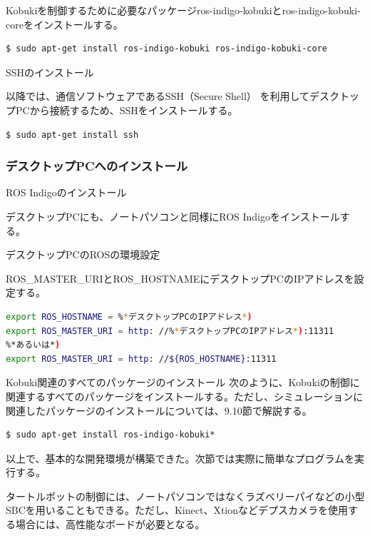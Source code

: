 \begin{itemize}
Kobukiを制御するために必要なパッケージros-indigo-kobukiとros-indigo-kobuki-coreをインストールする。

\begin{lstlisting}[language=ROS]
$ sudo apt-get install ros-indigo-kobuki ros-indigo-kobuki-core
\end{lstlisting}

\circled{\thenum} SSHのインストール

以降では、通信ソフトウェアであるSSH（Secure Shell）  を利用してデスクトップPCから接続するため、SSHをインストールする。

\begin{lstlisting}[language=ROS]
$ sudo apt-get install ssh
\end{lstlisting}


\subsubsection{デスクトップPCへのインストール}

\setcounter{num}{0}

\circled{\thenum} ROS Indigoのインストール

デスクトップPCにも、ノートパソコンと同様にROS Indigoをインストールする。

\circled{\thenum} デスクトップPCのROSの環境設定

ROS\_MASTER\_URIとROS\_HOSTNAMEにデスクトップPCのIPアドレスを設定する。

\begin{lstlisting}[language=bash]
export ROS_HOSTNAME = %*デスクトップPCのIPアドレス*)
export ROS_MASTER_URI = http: //%*デスクトップPCのIPアドレス*):11311
%*あるいは*)
export ROS_MASTER_URI = http: //${ROS_HOSTNAME}:11311
\end{lstlisting}

\circled{\thenum} Kobuki関連のすべてのパッケージのインストール
次のように、Kobukiの制御に関連するすべてのパッケージをインストールする。ただし、シミュレーションに関連したパッケージのインストールについては、9.10節で解説する。

\begin{lstlisting}[language=ROS]
$ sudo apt-get install ros-indigo-kobuki*
\end{lstlisting}

以上で、基本的な開発環境が構築できた。次節では実際に簡単なプログラムを実行する。

\begin{exercise}
タートルボットの制御には、ノートパソコンではなくラズベリーパイなどの小型SBCを用いることもできる。ただし、Kinect、Xtionなどデプスカメラを使用する場合には、高性能なボードが必要となる。
\end{exercise}


\end{itemize}
